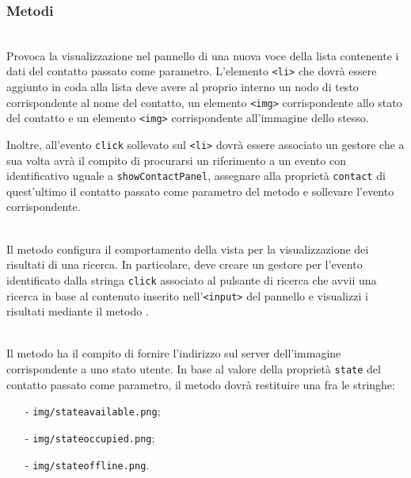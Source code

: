 \subsubsection*{Metodi}
\begin{description}
  
  \item{}\\
  Provoca la visualizzazione nel pannello di una nuova voce della lista contenente i dati del contatto passato come parametro. L'elemento \verb'<li>' che dovrà essere aggiunto in coda alla lista deve avere al proprio interno un nodo di testo corrispondente al nome del contatto, un elemento \verb'<img>' corrispondente allo stato del contatto e un elemento \verb'<img>' corrispondente all'immagine dello stesso.
  
  Inoltre, all'evento \verb'click' sollevato sul \verb'<li>' dovrà essere associato un gestore che a sua volta avrà il compito di procurarsi un riferimento a un evento con identificativo uguale a \verb'showContactPanel', assegnare alla proprietà \verb'contact' di quest'ultimo il contatto passato come parametro del metodo e sollevare l'evento corrispondente.
  
  \item{}\\
  Il metodo configura il comportamento della vista per la visualizzazione dei risultati di una ricerca. In particolare, deve creare un gestore per l'evento identificato dalla stringa \verb'click' associato al pulsante di ricerca che avvii una ricerca in base al contenuto inserito nell'\verb'<input>' del pannello e visualizzi i risultati mediante il metodo .

  \item{}\\
  Il metodo ha il compito di fornire l'indirizzo sul server dell'immagine corrispondente a uno stato utente. In base al valore della proprietà \verb'state' del contatto passato come parametro, il metodo dovrà restituire una fra le stringhe:
  \begin{itemize}
    \item[-] \verb'img/stateavailable.png';
    \item[-] \verb'img/stateoccupied.png';
    \item[-] \verb'img/stateoffline.png'.
  \end{itemize}

\end{description}

